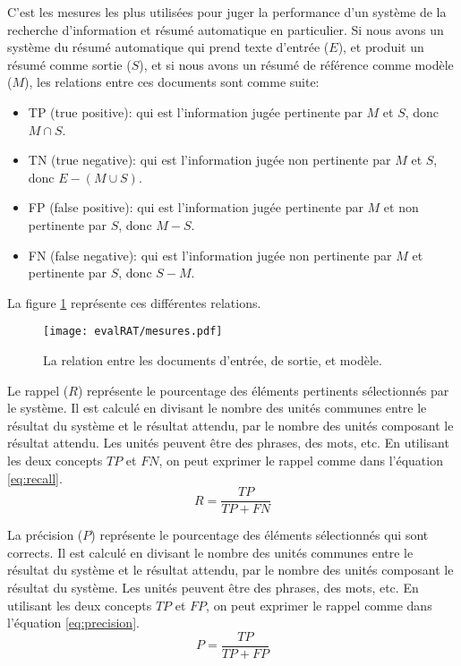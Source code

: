 \documentclass[a4paper,12pt,oneside]{../use/ESIthesis}
\begin{document}
C'est les mesures les plus utilisées pour juger la performance d'un système de la recherche d'information \cite{08-manning-al} et résumé automatique en particulier. 
Si nous avons un système du résumé automatique qui prend texte d'entrée ($E$), et produit un résumé comme sortie ($S$), et si nous avons un résumé de référence comme modèle ($M$), les relations entre ces documents sont comme suite:
\begin{itemize}
\item TP (true positive): qui est l'information jugée pertinente par $M$ et $S$, donc $M \cap S$.
\item TN (true negative): qui est l'information jugée non pertinente par $M$ et $S$, donc $E - (M \cup S)$.
\item FP (false positive): qui est l'information jugée pertinente par $M$ et non pertinente par $S$, donc $M - S$.
\item FN (false negative): qui est l'information jugée non pertinente par $M$ et pertinente par $S$, donc $S - M$.
\end{itemize}
La figure \ref{fig:mesures} représente ces différentes relations.
%
\begin{figure}[ht]
\begin{center}
\texttt{[image: evalRAT/mesures.pdf]} %
 \caption{La relation entre les documents d'entrée, de sortie, et modèle.}
 \label{fig:mesures}
\end{center}
\end{figure}

Le rappel ($R$) représente le pourcentage des éléments pertinents sélectionnés par le système. 
Il est calculé en divisant le nombre des unités communes entre le résultat du système et le résultat attendu, par le nombre des unités composant le résultat attendu. 
Les unités peuvent être des phrases, des mots, etc. 
En utilisant les deux concepts $TP$ et $FN$, on peut exprimer le rappel comme dans l'équation \ref{eq:recall}.
\begin{equation}
\label{eq:recall}
R = \frac {TP} {TP + FN}
\end{equation}

La précision ($P$) représente le pourcentage des éléments sélectionnés qui sont corrects. 
Il est calculé en divisant le nombre des unités communes entre le résultat du système et le résultat attendu, par le nombre des unités composant le résultat du système. 
Les unités peuvent être des phrases, des mots, etc. 
En utilisant les deux concepts $TP$ et $FP$, on peut exprimer le rappel comme dans l'équation \ref{eq:precision}.
\begin{equation}
\label{eq:precision}
P = \frac {TP} {TP + FP}
\end{equation}
\end{document}
